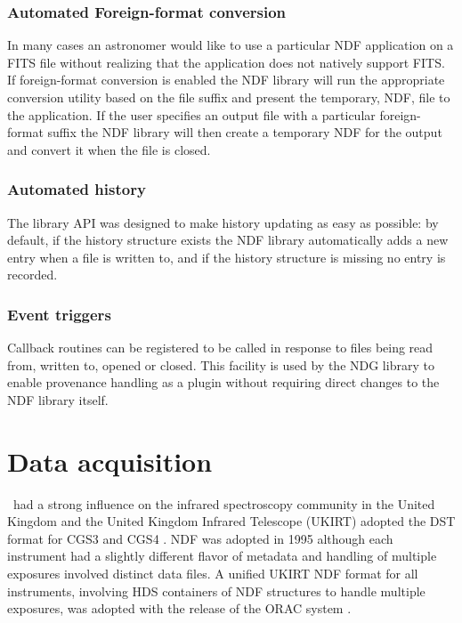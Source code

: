 \documentclass[final,authoryear,5p,times,twocolumn]{elsarticle}
\begin{document}
\subsubsection{Automated Foreign-format conversion}

In many cases an astronomer would like to use a particular NDF
application on a FITS file without realizing that the application does
not natively support FITS. If foreign-format conversion is enabled the
NDF library will run the appropriate conversion utility based on the
file suffix and present the temporary, NDF, file to the application. If the
user specifies an output file with a particular foreign-format suffix
the NDF library will then create a temporary NDF for the output and convert
it when the file is closed.

\subsubsection{Automated history}

The library API was designed to make history updating as easy
as possible: by default, if the history structure exists the NDF
library automatically adds a new entry when a file is written
to, and if the history structure is missing no entry is recorded.

\subsubsection{Event triggers}

Callback routines can be registered to be called in response to files
being read from, written to, opened or closed. This facility is used
by the NDG library \citep{SUN2} to enable provenance handling
as a plugin without requiring direct changes to the NDF library itself.

\section{Data acquisition}
\label{sec:daq}

\figaro\ had a strong influence on the infrared spectroscopy community
in the United Kingdom and the United Kingdom Infrared Telescope
(UKIRT) adopted the DST format for CGS3 and CGS4 \citep{1993SPIE.1946..547W}. NDF was adopted in
1995 although each instrument had a slightly different flavor of
metadata and handling of multiple exposures involved distinct data
files. A unified UKIRT NDF format for all instruments, involving HDS
containers of NDF structures to handle multiple exposures, was
adopted with the release of the ORAC system \citep{2000SPIE.4009..227B}.
\end{document}
